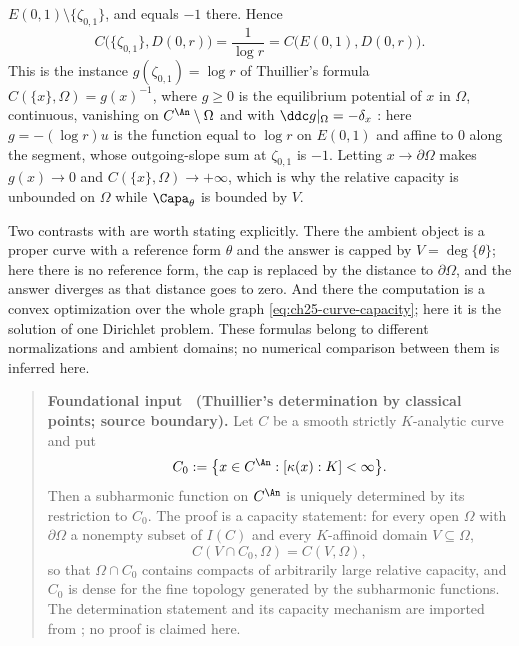 \begin{example}
$E(0,1)\setminus\{\zeta_{0,1}\}$, and equals $-1$ there.  Hence
\[
 C\bigl(\{\zeta_{0,1}\},D(0,r)\bigr)=\frac1{\log r}
 =C\bigl(E(0,1),D(0,r)\bigr).
\]
This is the instance $g(\zeta_{0,1})=\log r$ of Thuillier's formula
$C(\{x\},\Omega)=g(x)^{-1}$, where $g\geq0$ is the equilibrium
potential of $x$ in $\Omega$, continuous, vanishing on
$C^{\An}\setminus\Omega$ and with $\ddc g|_\Omega=-\delta_x$
\cite[Lemme~3.6.28]{Thu05}: here $g=-(\log r)u$ is the function
equal to $\log r$ on $E(0,1)$ and affine to $0$ along the segment, whose
outgoing-slope sum at $\zeta_{0,1}$ is $-1$.  Letting $x\to\partial\Omega$
makes $g(x)\to0$ and $C(\{x\},\Omega)\to+\infty$, which is why the
relative capacity is unbounded on $\Omega$ while $\Capa_\theta$ is
bounded by $V$.

Two contrasts with  are worth stating
explicitly.  There the ambient object is a proper curve with a reference
form $\theta$ and the answer is capped by $V=\deg\{\theta\}$; here there is no
reference form, the cap is replaced by the distance to $\partial\Omega$,
and the answer diverges as that distance goes to zero.  And there the
computation is a convex optimization over the whole graph
\eqref{eq:ch25-curve-capacity}; here it is the solution of one Dirichlet
problem.  These formulas belong to different normalizations and ambient domains;
no numerical comparison between them is inferred here.
\end{example}

\label{thm:ch25-thuillier-classical-points}
\begin{quote}
\textbf{Foundational input \thetheorem\ (Thuillier's determination by
classical points; source boundary).}
Let $C$ be a smooth strictly $K$-analytic curve and put
\[
 C_0:=\bigl\{x\in C^{\An}:[\kappa(x):K]<\infty\bigr\}.
\]
Then a subharmonic function on $C^{\An}$ is uniquely determined by its
restriction to $C_0$.  The proof is a capacity statement: for every open
$\Omega$ with $\partial\Omega$ a nonempty subset of $I(C)$ and every
$K$-affinoid domain $V\subseteq\Omega$,
\[
 C(V\cap C_0,\Omega)=C(V,\Omega),
\]
so that $\Omega\cap C_0$ contains compacts of arbitrarily large relative
capacity, and $C_0$ is dense for the fine topology generated by the
subharmonic functions.
The determination statement and its capacity mechanism are imported from
\cite[Th\'eor\`eme~3.6.26 and Proposition~3.6.29]{Thu05}; no proof is
claimed here.
\end{quote}

